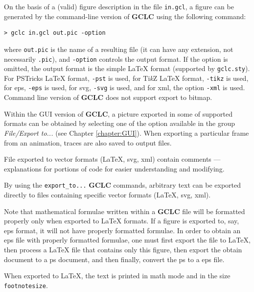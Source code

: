 \documentclass[a4paper]{book}
\newcommand{\gclc}{{\bfseries GCLC}\xspace}
\begin{document}
On the basis of a (valid) figure description in the file \verb|in.gcl|,
a figure can be generated by the command-line version of \gclc using
the following command:

\begin{verbatim}
> gclc in.gcl out.pic -option
\end{verbatim}

\noindent
where \verb|out.pic| is the name of a resulting file (it can have any
extension, not necessarily \verb|.pic|), and \verb|-option| controls
the output format. If the option is omitted, the output format is
the simple \LaTeX{} format (supported by \verb|gclc.sty|).
For PSTricks \LaTeX{} format, \verb|-pst| is used,
for Ti{\em k}Z \LaTeX{} format, \verb|-tikz| is used,
for {\sc eps}, \verb|-eps| is used, for {\sc svg}, \verb|-svg| is
used, and for {\sc xml}, the option \verb|-xml| is used.
Command line version of \gclc does not support export to bitmap.

Within the GUI version of \gclc, a picture exported in some of 
supported formats can be obtained by selecting one of the option 
available in the group {\it File/Export to...} (see Chapter 
\ref{chapter:GUI}). When exporting a particular frame from an 
animation, traces are also saved to output files.

File exported to vector formats (\LaTeX, {\sc svg}, {\sc xml})
contain comments --- explanations for portions of code for
easier understanding and modifying.

By using the \verb|export_to...| \gclc commands, arbitrary text can
be exported directly to files containing specific vector formats
(\LaTeX, {\sc svg}, {\sc xml}).

Note that mathematical formulae written within a \gclc file
will be formatted properly only when exported to \LaTeX{} formats.
If a figure is exported to, say, {\sc eps} format, it will
not have properly formatted formulae. In order to obtain an {\sc eps}
file with properly formatted formulae, one must first export the
file to \LaTeX{}, then process a \LaTeX{} file that contains
only this figure, then export the obtain document to a {\sc ps}
document, and then finally, convert the {\sc ps} to a {\sc eps} file.

When exported to \LaTeX{}, the text is printed in math mode and
in the size \verb|footnotesize|.
\end{document}

